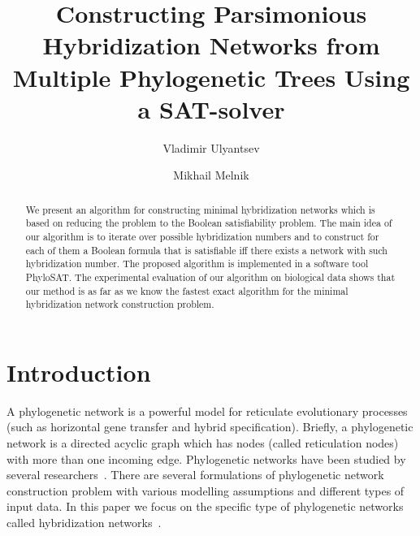 \documentclass[runningheads, envcountsame, a4paper]{llncs}
\begin{document}
\mainmatter           
\title{Constructing Parsimonious Hybridization Networks from Multiple Phylogenetic Trees Using a SAT-solver}
\titlerunning{ } 
\toctitle{ }

\author{Vladimir Ulyantsev \and Mikhail Melnik}

\maketitle
\setcounter{footnote}{0}

\begin{abstract}
  We present an algorithm for constructing minimal hybridization networks which is based on reducing 
  the problem to the Boolean satisfiability problem. The main idea of our algorithm is to iterate over
  possible hybridization numbers and to construct for each of them a Boolean formula that is satisfiable iff there
  exists a network with such hybridization number. The proposed algorithm is implemented in a software tool PhyloSAT.
  The experimental evaluation of our algorithm on biological data shows that our method is as far as we know the 
  fastest exact algorithm for the minimal hybridization network construction problem.

\end{abstract}

\section{Introduction}

A phylogenetic network is a powerful model for reticulate
evolutionary processes (such as horizontal gene transfer and hybrid specification).
Briefly, a phylogenetic network is a directed acyclic graph which has
nodes (called reticulation nodes) with more than one incoming edge. Phylogenetic
networks have been studied by several researchers~\cite{huson2010phylogenetic, morrison2011introduction, 
nakhleh2011evolutionary}. There are several formulations of phylogenetic network
construction problem with various modelling assumptions and different types of input data. 
In this paper we focus on the specific type of phylogenetic networks called hybridization
networks~\cite{semple2006hybridization, chen2010hybridnet}.
\end{document}
